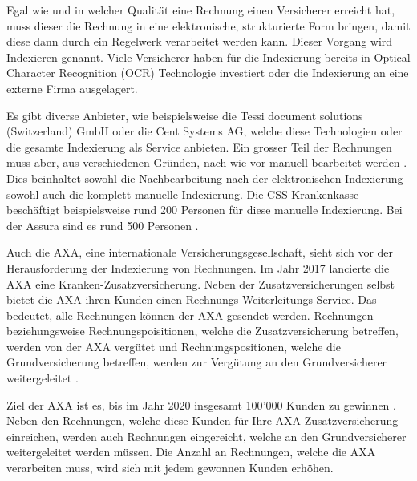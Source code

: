 \documentclass{hwz}
\begin{document}
Egal wie und in welcher Qualität eine Rechnung einen Versicherer erreicht hat, muss dieser die Rechnung in eine elektronische, strukturierte Form bringen, damit diese dann durch ein Regelwerk verarbeitet werden kann. Dieser Vorgang wird Indexieren genannt. Viele Versicherer haben für die Indexierung bereits in Optical Character Recognition (OCR) Technologie investiert oder die Indexierung an eine externe Firma ausgelagert. 

Es gibt diverse Anbieter, wie beispielsweise die Tessi document solutions (Switzerland) GmbH oder die Cent Systems AG, welche diese Technologien oder die gesamte Indexierung als Service anbieten. Ein grosser Teil der Rechnungen muss aber, aus verschiedenen Gründen, nach wie vor manuell bearbeitet werden . Dies beinhaltet sowohl die Nachbearbeitung nach der elektronischen Indexierung sowohl auch die komplett manuelle Indexierung. Die CSS Krankenkasse beschäftigt beispielsweise rund 200 Personen für diese manuelle Indexierung. Bei der Assura sind es rund 500 Personen .



Auch die AXA, eine internationale Versicherungsgesellschaft, sieht sich vor der Herausforderung der Indexierung von Rechnungen. Im Jahr 2017 lancierte die AXA eine Kranken-Zusatzversicherung. Neben der Zusatzversicherungen selbst bietet die AXA ihren Kunden einen Rechnungs-Weiterleitungs-Service. Das bedeutet, alle Rechnungen können der AXA gesendet werden. Rechnungen beziehungsweise Rechnungspoisitionen, welche die Zusatzversicherung betreffen, werden von der AXA vergütet und Rechnungspositionen, welche die Grundversicherung betreffen, werden zur Vergütung an den Grundversicherer weitergeleitet \autocite{finanzen.ch2017AxaGewinnen}.

Ziel der AXA ist es, bis im Jahr 2020 insgesamt 100'000 Kunden zu gewinnen \autocite{finanzen.ch2017AxaGewinnen}. Neben den Rechnungen, welche diese Kunden für Ihre AXA Zusatzversicherung einreichen, werden auch Rechnungen eingereicht, welche an den Grundversicherer weitergeleitet werden müssen. Die Anzahl an Rechnungen, welche die AXA verarbeiten muss, wird sich mit jedem gewonnen Kunden erhöhen.
\end{document}
